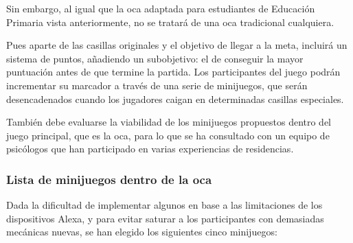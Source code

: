 Sin embargo, al igual que la oca adaptada para estudiantes de Educación Primaria vista anteriormente, no se tratará de una oca tradicional cualquiera. 

Pues aparte de las casillas originales y el objetivo de llegar a la meta, incluirá un sistema de puntos, añadiendo un subobjetivo: el de conseguir la mayor puntuación antes de que termine la partida. Los participantes del juego podrán incrementar su marcador a través de una serie de minijuegos, que serán desencadenados cuando los jugadores caigan en determinadas casillas especiales.

También debe evaluarse la viabilidad de los minijuegos propuestos dentro del juego principal, que es la oca, para lo que se ha consultado con un equipo de psicólogos que han participado en varias experiencias de residencias.

\subsubsection{Lista de minijuegos dentro de la oca}
Dada la dificultad de implementar algunos en base a las limitaciones de los dispositivos Alexa, y para evitar saturar a los participantes con demasiadas mecánicas nuevas, se han elegido los siguientes cinco minijuegos:


